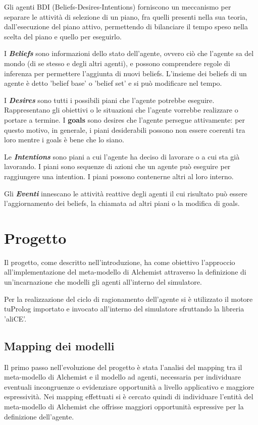 \documentclass[12pt,a4paper,openright,twoside]{report}
\begin{document}
Gli agenti BDI (Beliefs-Desires-Intentions) forniscono un meccanismo per separare le attivit\`a di selezione di un piano, fra quelli presenti nella sua teoria, dall'esecuzione del piano attivo, permettendo di bilanciare il tempo speso nella scelta del piano e quello per eseguirlo.

I \textbf{\textit{Beliefs}} sono informazioni dello stato dell'agente, ovvero ci\`o che l'agente sa del mondo (di se stesso e degli altri agenti), e possono comprendere regole di inferenza per permettere l'aggiunta di nuovi beliefs. L'insieme dei beliefs di un agente \`e detto 'belief base' o 'belief set' e si pu\`o modificare nel tempo.

I \textbf{\textit{Desires}} sono tutti i possibili piani che l'agente potrebbe eseguire. Rappresentano gli obiettivi o le situazioni che l'agente vorrebbe realizzare o portare a termine. I \textbf{goals} sono desires che l'agente persegue attivamente: per questo motivo, in generale, i piani desiderabili possono non essere coerenti tra loro mentre i goals \`e bene che lo siano.

Le \textbf{\textit{Intentions}} sono piani a cui l'agente ha deciso di lavorare o a cui sta gi\`a lavorando. I piani sono sequenze di azioni che un agente pu\`o eseguire per raggiungere una intention. I piani possono contenerne altri al loro interno.

Gli \textbf{\textit{Eventi}} innescano le attivit\`a reattive degli agenti il cui risultato pu\`o essere l'aggiornamento dei beliefs, la chiamata ad altri piani o la modifica di goals.


\chapter{Progetto}
\lhead[\fancyplain{}{\bfseries\thepage}]{\fancyplain{}{\bfseries\rightmark}}
Il progetto, come descritto nell'introduzione, ha come obiettivo l'approccio all'implementazione del meta-modello di Alchemist attraverso la definizione di un'incarnazione che modelli gli agenti all'interno del simulatore.

Per la realizzazione del ciclo di ragionamento dell'agente si \`e utilizzato il motore tuProlog importato e invocato all'interno del simulatore sfruttando la libreria 'aliCE'.


\section{Mapping dei modelli}
Il primo passo nell'evoluzione del progetto \`e stata l'analisi del mapping tra il meta-modello di Alchemist e il modello ad agenti, necessaria per individuare eventuali incongruenze o evidenziare opportunit\`a a livello applicativo e maggiore espressivit\`a.
Nei mapping effettuati si \`e cercato quindi di individuare l'entit\`a del meta-modello di Alchemist che offrisse maggiori opportunit\`a espressive per la definizione dell'agente.
\end{document}
